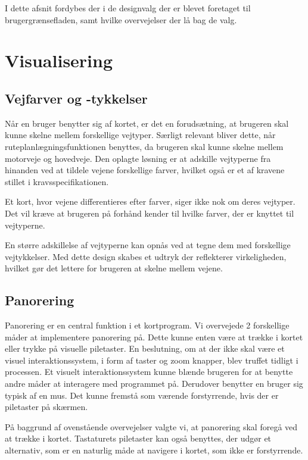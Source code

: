 I dette afsnit fordybes der i de designvalg der er blevet foretaget til brugergrænsefladen, samt hvilke overvejelser der lå bag de valg.

\section{Visualisering}

\subsection{Vejfarver og -tykkelser}

Når en bruger benytter sig af kortet, er det en forudsætning, at brugeren skal kunne skelne mellem forskellige vejtyper. Særligt relevant bliver dette, når ruteplanlægningsfunktionen benyttes, da brugeren skal kunne skelne mellem motorveje og hovedveje. Den oplagte løsning er at adskille vejtyperne fra hinanden ved at tildele vejene forskellige farver, hvilket også er et af kravene stillet i kravsspecifikationen. 

Et kort, hvor vejene differentieres efter farver, siger ikke nok om deres vejtyper. Det vil kræve at brugeren på forhånd kender til hvilke farver, der er knyttet til vejtyperne. 

En større adskillelse af vejtyperne kan opnås ved at tegne dem med forskellige vejtykkelser. Med dette design skabes et udtryk der reflekterer virkeligheden, hvilket gør det lettere for brugeren at skelne mellem vejene. 


\subsection{Panorering}

Panorering er en central funktion i et kortprogram. Vi overvejede 2 forskellige måder at implementere panorering på. Dette kunne enten være at trække i kortet eller trykke på visuelle piletaster. En beslutning, om at der ikke skal være et visuel interaktionssystem, i form af taster og zoom knapper, blev truffet tidligt i processen. Et visuelt interaktionssystem kunne blænde brugeren for at benytte andre måder at interagere med programmet på. Derudover benytter en bruger sig typisk af en mus. Det kunne fremstå som værende forstyrrende, hvis der er piletaster på skærmen.  

På baggrund af ovenstående overvejelser valgte vi, at panorering skal foregå ved at trække i kortet. Tastaturets piletaster kan også benyttes, der udgør et alternativ, som er en naturlig måde at navigere i kortet, som ikke er forstyrrende. 


